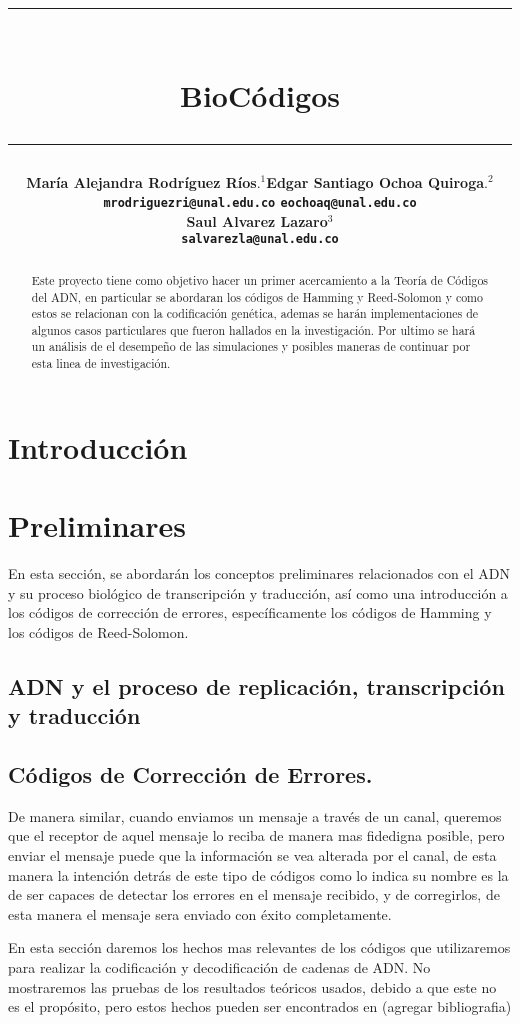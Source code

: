 \documentclass[12pt]{article}
\title{\vspace{-2cm}\par\noindent\rule{16cm}{1pt}\large
\\\bfseries BioCódigos
\vspace{-0.34cm}\par\noindent\hspace{0.15cm}\rule{16cm}{1pt}
\vspace{-0.6cm}
}
\author{\small \bfseries María Alejandra Rodríguez Ríos$.^1$\quad \quad\small Edgar Santiago Ochoa Quiroga$.^{2}$\\ \small \quad \texttt{mrodriguezri@unal.edu.co} \quad \quad \quad \quad \quad \quad \texttt{eochoaq@unal.edu.co}\quad\quad \quad\\ \small \bfseries Saul Alvarez Lazaro$^{3}$\\
\small \texttt{salvarezla@unal.edu.co}
}
\begin{document}
\maketitle
\begin{abstract}
Este proyecto tiene como objetivo hacer un primer acercamiento a la Teoría de Códigos del ADN, en particular se abordaran los códigos de Hamming y Reed-Solomon y como estos se relacionan con la codificación genética, ademas se harán implementaciones de algunos casos particulares que fueron hallados en la investigación. Por ultimo se hará un análisis de el desempeño de las simulaciones y posibles maneras de continuar por esta linea de investigación.
\end{abstract}

\section{Introducción}





\section{Preliminares}
En esta sección, se abordarán los conceptos preliminares relacionados con el ADN y su proceso biológico de transcripción y traducción, así como una introducción a los códigos de corrección de errores, específicamente los códigos de Hamming y los códigos de Reed-Solomon.
\subsection{ADN y el proceso de replicación, transcripción y traducción}

\subsection{Códigos de Corrección de Errores.}
De manera similar, cuando enviamos un mensaje a través de un canal, queremos que el receptor de aquel mensaje lo reciba de manera mas fidedigna posible, pero enviar el mensaje puede que la información se vea alterada por el canal, de esta manera la intención detrás de este tipo de códigos como lo indica su nombre es la de ser capaces de detectar los errores en el mensaje recibido, y de corregirlos, de esta manera el mensaje sera enviado con éxito completamente.

En esta sección daremos los hechos mas relevantes de los códigos que utilizaremos para realizar la codificación y decodificación de cadenas de ADN. No mostraremos las pruebas de los resultados teóricos usados, debido a que este no es el propósito, pero estos hechos pueden ser encontrados en (agregar bibliografia)


\end{document}
